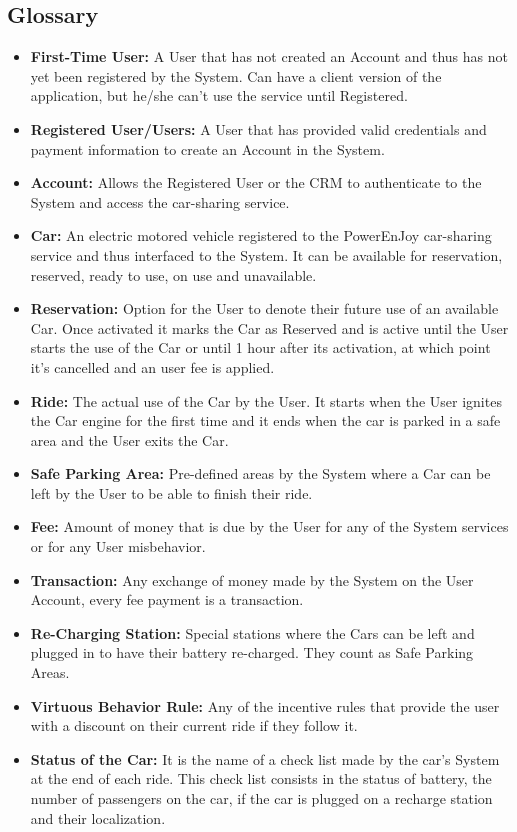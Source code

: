 \documentclass[a4paper]{article}
\begin{document}
\subsection{Glossary}
\begin{itemize}
\item \textbf{First-Time User:} A User that has not created an Account and thus has not yet been registered by the System. Can have a client version of the application, but he/she can't use the service until Registered.
\item \textbf{Registered User/Users:} A User that has provided valid credentials and payment information to create an Account in the System.
\item \textbf{Account:} Allows the Registered User or the CRM to authenticate to the System and access the car-sharing service.
\item \textbf{Car:} An electric motored vehicle registered to the PowerEnJoy car-sharing service and thus interfaced to the System. It can be available for reservation, reserved, ready to use, on use and unavailable.
\item \textbf{Reservation:} Option for the User to denote their future use of an available Car. Once activated it marks the Car as Reserved and is active until the User starts the use of the Car or until 1 hour after its activation, at which point it's cancelled and an user fee is applied.
\item \textbf{Ride:} The actual use of the Car by the User. It starts when the User ignites the Car engine for the first time and it ends when the car is parked in a safe area and the User exits the Car.
\item \textbf{Safe Parking Area:} Pre-defined areas by the System where a Car can be left by the User to be able to finish their ride.
\item \textbf{Fee:} Amount of money that is due by the User for any of the System services or for any User misbehavior.
\item \textbf{Transaction:} Any exchange of money made by the System on the User Account, every fee payment is a transaction.
\item \textbf{Re-Charging Station:} Special stations where the Cars can be left and plugged in to have their battery re-charged. They count as Safe Parking Areas.
\item \textbf{Virtuous Behavior Rule:} Any of the incentive rules that provide the user with a discount on their current ride if they follow it.
\item \textbf{Status of the Car:} It is the name of a check list made by the car’s System at the end of each ride. This check list consists in the status of battery, the number of passengers on the car, if the car is plugged on a recharge station and their localization.

\end{itemize}
\end{document}
